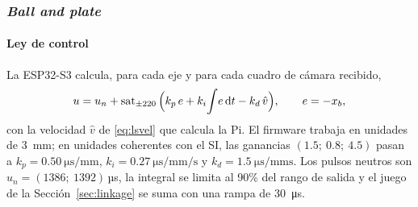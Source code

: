 \subsubsection{\textit{Ball and plate}}
\label{sec:ballcontrol}

\paragraph{Ley de control}
La ESP32-S3 calcula, para cada eje y para cada cuadro de cámara recibido,
\begin{equation}
  u=u_n+\operatorname{sat}_{\pm220}\Big(k_p\,e+k_i\!\int\!e\,\mathrm{d} t-k_d\,\hat v\Big),\qquad e=-x_b,
  \label{eq:ballpid}
\end{equation}
con la velocidad $\hat v$ de \eqref{eq:lsvel} que calcula la Pi. El firmware trabaja en unidades de \SI{3}{\milli\metre}; en unidades coherentes con el SI, las ganancias $(1.5;\ 0.8;\ 4.5)$ pasan a $k_p=\SI{0.50}{\micro\second\per\milli\metre}$, $k_i=\SI{0.27}{\micro\second\per\milli\metre\per\second}$ y $k_d=\SI{1.5}{\micro\second\per\milli\metre\second}$. Los pulsos neutros son $u_n=(1386;\ 1392)$\,µs, la integral se limita al 90\% del rango de salida y el juego de la Sección~\ref{sec:linkage} se suma con una rampa de \SI{30}{\micro\second}.

